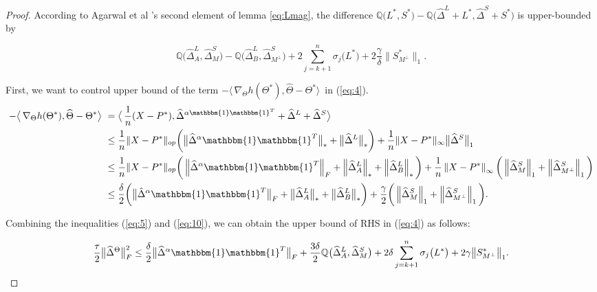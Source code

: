 \documentclass[AMS,STIX1COL]{WileyNJD-v2}
\begin{document}
{\begin{proof}
According to Agarwal et al \cite{agarwal2012noisy}'s second element of lemma \ref{eq:Lmag},
the difference $\mathbb{Q}\big(L^*,S^*\big)- \mathbb{Q}\big(\widehat{\Delta}^L + L^{*},\widehat{\Delta}^S + S^{*}\big)$ is upper-bounded by

\begin{equation}\label{eq:5}
    \mathbb{Q}\big(\widehat{\Delta}^L_{A},\widehat{\Delta}^S_{M}\big) - \mathbb{Q}\big(\widehat{\Delta}^L_{B},\widehat{\Delta}^S_{M^\perp}\big)
    +2 \sum_{j=k+1}^{n} \sigma_{j}\big(L^*\big) + 2\frac{\gamma}{\delta}\big\|S^*_{M^\perp}\big\|_{1}.
\end{equation}

First, we want to control upper bound of the term $-\big\langle\,\nabla_{\Theta}h(\Theta^{*}),\widehat{\Theta}-\Theta^{*} \big\rangle\,$
in (\ref{eq:4}).
\begin{align}
-\big\langle\,\nabla_{\Theta}h(\Theta^{*}),\widehat{\Theta}-\Theta^{*} \big\rangle\  \nonumber
&=\big\langle\, \frac{1}{n} (X - P^*), \widehat\Delta^{\alpha\mathbbm{1}\mathbbm{1}^T} + \widehat\Delta^{L} + \widehat\Delta^{S} \big\rangle\ \\ \nonumber
&\leq \frac{1}{n} \|X - P^*\|_{op}\bigg(\big\|\widehat{\Delta}^{\alpha}\mathbbm{1}\mathbbm{1}^T\big\|_\ast + \big\|\widehat{\Delta}^{L}\big\|_\ast\bigg) +  \frac{1}{n} \|X - P^*\|_{\infty}\big\|\widehat{\Delta}^{S}\big\|_{1} \\ \nonumber
&\leq \frac{1}{n} \|X - P^*\|_{op}\bigg(\left\|\widehat{\Delta}^{\alpha}\mathbbm{1}\mathbbm{1}^T\right\|_{F} + \left\|\widehat{\Delta}^{L}_{A}\right\|_\ast + \left\|\widehat{\Delta}^{L}_{B}\right\|_\ast\bigg) +
\frac{1}{n} \left\|X - P^*\right\|_{\infty}\bigg(\left\|\widehat{\Delta}^{S}_{M}\right\|_{1} +
\left\|\widehat{\Delta}^{S}_{M^{\perp}}\right\|_{1}\bigg) \\
&\leq \frac{\delta}{2}\bigg(\big\|\hat{\Delta}^{\alpha}\mathbbm{1}\mathbbm{1}^T\big\|_{F} + \big\|\widehat{\Delta}^{L}_{A}\big\|_\ast + \big\|\widehat{\Delta}^{L}_{B}\big\|_\ast\bigg) + \frac{\gamma}{2}\bigg(\left\|\widehat{\Delta}^{S}_{M}\right\|_{1} +
\left\|\widehat{\Delta}^{S}_{M^{\perp}}\right\|_{1}\bigg).  \label{eq:10}
\end{align}

Combining the inequalities (\ref{eq:5}) and (\ref{eq:10}), we can obtain the upper bound of RHS in (\ref{eq:4}) as follows:

\begin{equation}
    \frac{\tau}{2}\big\|\widehat{\Delta}^{\Theta}\big\|_{F}^{2} \leq
    \frac{\delta}{2}\big\|\widehat{\Delta}^{\alpha}\mathbbm{1}\mathbbm{1}^T\big\|_{F} +
    \frac{3\delta}{2}\mathbb{Q}\big(\widehat{\Delta}^L_{A},\widehat{\Delta}^S_{M}\big)
    +2 \delta \sum_{j=k+1}^{n} \sigma_{j}\big(L^*\big) + 2\gamma \big\|S^*_{M^\perp}\big\|_{1}.
    \label{eq:11}
\end{equation}


\end{proof}}
\end{document}

